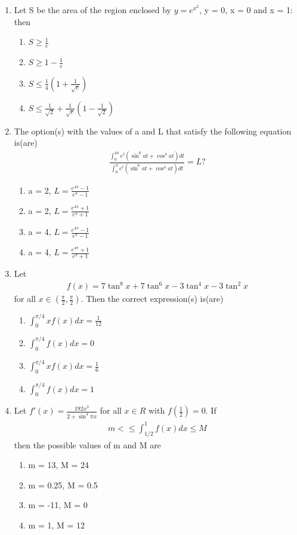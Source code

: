 \begin{enumerate}[label=\arabic*.,ref=\thesubsection.\theenumi]
\item Let S be the area of the region enclosed by $y = e^{x^{2}}$, y = 0, x = 0 and x = 1: then
\begin{enumerate}
\item $S \geq \frac{1}{e}$
\item $S \geq 1-\frac{1}{e}$
\item $S \leq \frac{1}{4}(1 + \frac{1}{\sqrt{e}})$
\item $S \leq \frac{1}{\sqrt{2}} + \frac{1}{\sqrt{e}}(1 - \frac{1}{\sqrt{2}})$
\end{enumerate}

\item The option(s) with the values of a and L that satisfy the following equation is(are)
\begin{align*}
\frac{\int_{0}^{4\pi}e^{t}(\sin^{6}at + \cos^{4}at)dt}{\int_{0}^{\pi}e^{t}(\sin^{6}at + \cos^{4}at)dt} = L?
\end{align*}
\begin{enumerate}
\item a = 2, $L = \frac{e^{4\pi} - 1}{e^{\pi} - 1}$
\item a = 2, $L = \frac{e^{4\pi} + 1}{e^{\pi} + 1}$
\item a = 4, $L = \frac{e^{4\pi} - 1}{e^{\pi} - 1}$
\item a = 4, $L = \frac{e^{4\pi} + 1}{e^{\pi} + 1}$
\end{enumerate}

\item Let 
\begin{align*}
f(x) = 7\tan^{8}x + 7\tan^{6}x - 3\tan^{4}x - 3\tan^{2}x
\end{align*}
for all $x \in (\frac{\pi}{2}, \frac{\pi}{2})$. Then the correct expression(s) is(are)
\begin{enumerate}
\item $\int_{0}^{\pi/4}xf(x)dx = \frac{1}{12}$
\item $\int_{0}^{\pi/4}f(x)dx = 0$
\item $\int_{0}^{\pi/4}xf(x)dx = \frac{1}{6}$
\item $\int_{0}^{\pi/4}f(x)dx = 1$
\end{enumerate}

\item Let $f'(x) = \frac{192x^{3}}{2 + \sin^{4}\pi x}$ for all $x \in R$ with $f(\frac{1}{2}) = 0$. If 
\begin{align*}
m < \leq \int_{1/2}^{1}f(x)dx \leq M
\end{align*}
then the possible values of m and M are
\begin{enumerate}
\item m = 13, M = 24
\item m = 0.25, M = 0.5
\item m = -11, M = 0
\item m = 1, M = 12
\end{enumerate}


\end{enumerate}
